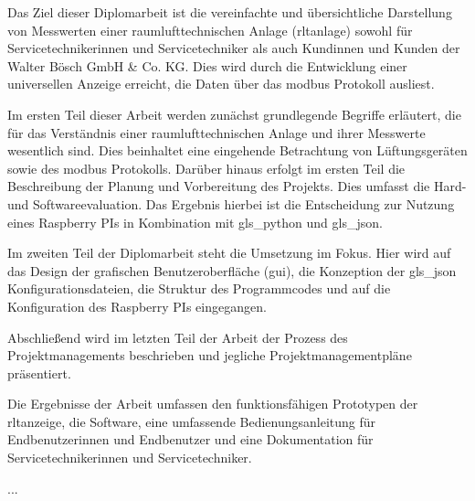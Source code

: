 \noindent Das Ziel dieser Diplomarbeit ist die vereinfachte und übersichtliche Darstellung von Messwerten einer raumlufttechnischen Anlage (\acs{rltanlage}) sowohl für Servicetechnikerinnen und Servicetechniker als auch Kundinnen und Kunden der Walter Bösch GmbH \& Co. KG. Dies wird durch die Entwicklung einer universellen Anzeige erreicht, die Daten über das \gls{modbus} Protokoll ausliest. 

Im ersten Teil dieser Arbeit werden zunächst grundlegende Begriffe erläutert, die für das Verständnis einer raumlufttechnischen Anlage und ihrer Messwerte wesentlich sind. Dies beinhaltet eine eingehende Betrachtung von Lüftungsgeräten sowie des \gls{modbus} Protokolls. Darüber hinaus erfolgt im ersten Teil die Beschreibung der Planung und Vorbereitung des Projekts. Dies umfasst die Hard- und Softwareevaluation. Das Ergebnis hierbei ist die Entscheidung zur Nutzung eines Raspberry PIs in Kombination mit \gls{gls_python} und \gls{gls_json}. 

Im zweiten Teil der Diplomarbeit steht die Umsetzung im Fokus. Hier wird auf das Design der grafischen Benutzeroberfläche (\acs{gui}), die Konzeption der \gls{gls_json} Konfigurationsdateien, die Struktur des Programmcodes und auf die Konfiguration des Raspberry PIs eingegangen. 

Abschließend wird im letzten Teil der Arbeit der Prozess des Projektmanagements beschrieben und jegliche Projektmanagementpläne präsentiert.

Die Ergebnisse der Arbeit umfassen den funktionsfähigen Prototypen der \ac{rltanzeige}, die Software, eine umfassende Bedienungsanleitung für Endbenutzerinnen und Endbenutzer und eine Dokumentation für Servicetechnikerinnen und Servicetechniker.


\noindent 

...